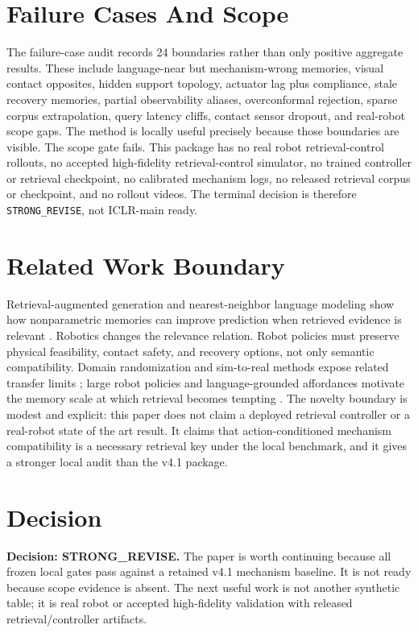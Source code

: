 \documentclass{article}
\begin{document}
\section{Failure Cases And Scope}
The failure-case audit records 24 boundaries rather than only positive aggregate results. These include language-near but mechanism-wrong memories, visual contact opposites, hidden support topology, actuator lag plus compliance, stale recovery memories, partial observability aliases, overconformal rejection, sparse corpus extrapolation, query latency cliffs, contact sensor dropout, and real-robot scope gaps. The method is locally useful precisely because those boundaries are visible.
The scope gate fails. This package has no real robot retrieval-control rollouts, no accepted high-fidelity retrieval-control simulator, no trained controller or retrieval checkpoint, no calibrated mechanism logs, no released retrieval corpus or checkpoint, and no rollout videos. The terminal decision is therefore \texttt{STRONG\_REVISE}, not ICLR-main ready.
\section{Related Work Boundary}
Retrieval-augmented generation and nearest-neighbor language modeling show how nonparametric memories can improve prediction when retrieved evidence is relevant \citep{lewis2020rag,khandelwal2020knn}. Robotics changes the relevance relation. Robot policies must preserve physical feasibility, contact safety, and recovery options, not only semantic compatibility. Domain randomization and sim-to-real methods expose related transfer limits \citep{tobin2017domain}; large robot policies and language-grounded affordances motivate the memory scale at which retrieval becomes tempting \citep{brohan2022rt1,ahn2022saycan}.
The novelty boundary is modest and explicit: this paper does not claim a deployed retrieval controller or a real-robot state of the art result. It claims that action-conditioned mechanism compatibility is a necessary retrieval key under the local benchmark, and it gives a stronger local audit than the v4.1 package.
\section{Decision}
\textbf{Decision: STRONG\_REVISE.} The paper is worth continuing because all frozen local gates pass against a retained v4.1 mechanism baseline. It is not ready because scope evidence is absent. The next useful work is not another synthetic table; it is real robot or accepted high-fidelity validation with released retrieval/controller artifacts.
\clearpage
\appendix
\end{document}
